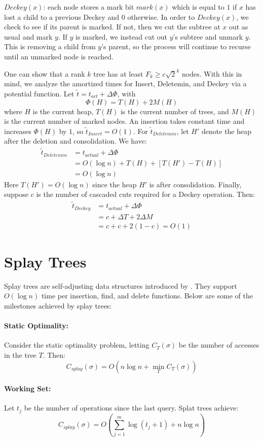 \documentclass[11pt]{article}
\begin{document}
$Deckey(x)$: each node stores a mark bit $mark(x)$ which is equal to $1$ if $x$ has lost a child to a previous Deckey and $0$ otherwise. In order to $Deckey(x)$, we check to see if its parent is marked. If not, then we cut the subtree at $x$ out as usual and mark $y$. If $y$ is marked, we instead cut out $y$'s subtree and unmark $y$. This is removing a child from $y$'s parent, so the process will continue to recurse until an unmarked node is reached. 

One can show that a rank $k$ tree has at least $F_k\ge c\sqrt{2}^{k}$ nodes. With this in mind, we analyze the amortized times for Insert, Deletemin, and Deckey via a potential function. Let $\tilde{t}=t_{act}+\Delta\Phi$, with
\[\Phi(H)=T(H)+2M(H)\]
where $H$ is the current heap, $T(H)$ is the current number of trees, and $M(H)$ is the current number of marked nodes. An insertion takes constant time and increases $\Phi(H)$ by $1$, so $\tilde{t}_{Insert}=O(1)$. For $\tilde{t}_{Deletemin}$, let $H'$ denote the heap after the deletion and consolidation. We have:
\begin{align*}
\tilde{t}_{Deletemin}&= t_{actual}+\Delta\Phi 
\\ &=O(\log n)+T(H)+[T(H')-T(H)]
\\ &=O(\log n)
\end{align*}
Here $T(H')=O(\log n)$ since the heap $H'$ is after consolidation. Finally, suppose $c$ is the number of cascaded cuts required for a Deckey operation. Then:
\begin{align*}
\tilde{t}_{Deckey}&= t_{actual}+\Delta\Phi 
\\ &=c+\Delta T+2\Delta M
\\ &=c+c+2(1-c)=O(1)
\end{align*}
\section*{Splay Trees}
Splay trees are self-adjusting data structures introduced by \cite{Tarj85}. They support $O(\log n)$ time per insertion, find, and delete functions. Below are some of the milestones achieved by splay trees:
\paragraph{Static Optimality:}
Consider the static optimality problem, letting $C_T(\sigma)$ be the number of accesses in the tree $T$. Then: 
\[C_{splay}(\sigma)=O(n\log n+\min_TC_T(\sigma))\]
\paragraph{Working Set:} Let $t_j$ be the number of operations since the last query. Splat trees achieve:
\[C_{splay}(\sigma)=O(\sum_{j=1}^m\log(t_j+1)+n\log n)\]
\end{document}
